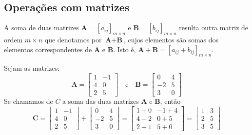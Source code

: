 \subsection{Operações com matrizes}
\begin{df}
	A soma de duas matrizes $\textbf{A}=[a_{ij}]_{m\times n}$ e $\textbf{B}=[b_{ij}]_{m\times n}$ resulta outra matriz de ordem $m\times n$ que denotamos por $\textbf{A}+\textbf{B}$, cujos elementos são somas dos elementos correspondentes de $\textbf{A}$ e $\textbf{B}$. Isto é, $\textbf{A}+\textbf{B}=[a_{ij}+b_{ij}]_{m\times n}$.
\end{df}
\begin{ex}
	Sejam as matrizes:\\
	\begin{equation*}
	\textbf{A}=\begin{bmatrix}
	1   & -1\\
	4   & 0\\
	2   &  5
	\end{bmatrix}\quad \text{e}\quad \textbf{B}=\begin{bmatrix}
	0  & 4 \\
	-2  & 5 \\
	3  & 0
	\end{bmatrix}  
	\end{equation*}
	Se chamamos de $C$ a soma das duas matrizes $\textbf{A}$ e $\textbf{B}$, então
	\begin{equation*}
	\textbf{C}=\begin{bmatrix}
	1   & -1\\
	4   & 0\\
	2   &  5
	\end{bmatrix} + \begin{bmatrix}
	0  & 4 \\
   -2  & 5 \\
	3  & 0
	\end{bmatrix}= \begin{bmatrix}
	1+0  & -1+4 \\
	4-2  & 0+5 \\
	2+1  & 5+0
	\end{bmatrix}=\begin{bmatrix}
	1  & 3 \\
	2  & 5 \\
	3  & 5
	\end{bmatrix} 
	\end{equation*} 
	
\end{ex}
